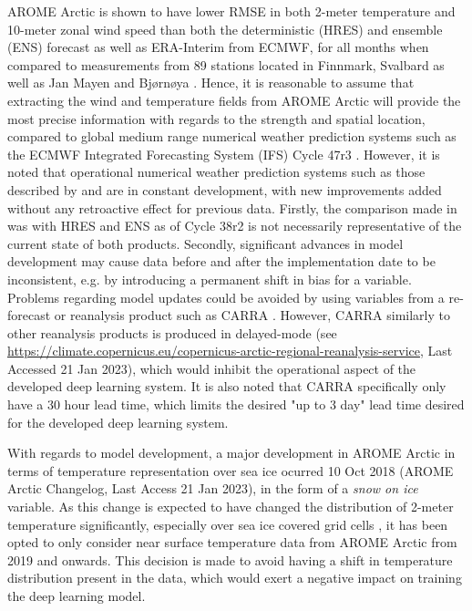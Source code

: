 \documentclass[../main/thesis.tex]{subfiles}
\begin{document}
AROME Arctic is shown to have lower RMSE in both 2-meter temperature and 10-meter zonal wind speed than both the deterministic (HRES) and ensemble (ENS) forecast as well as ERA-Interim from ECMWF, for all months when compared to measurements from 89 stations located in Finnmark, Svalbard as well as Jan Mayen and Bjørnøya \citep{Mueller2017}. Hence, it is reasonable to assume that extracting the wind and temperature fields from AROME Arctic will provide the most precise information with regards to the strength and spatial location, compared to global medium range numerical weather prediction systems such as the ECMWF Integrated Forecasting System (IFS) Cycle 47r3 \citep{Haiden2022}. However, it is noted that operational numerical weather prediction systems such as those described by \citet{Mueller2017} and \citet{Haiden2022} are in constant development, with new improvements added without any retroactive effect for previous data. Firstly, the comparison made in \citet{Mueller2017} was with HRES and ENS as of Cycle 38r2 \cite{Bauer2013} is not necessarily representative of the current state of both products. Secondly, significant advances in model development may cause data before and after the implementation date to be inconsistent, e.g. by introducing a permanent shift in bias for a variable. Problems regarding model updates could be avoided by using variables from a re-forecast or reanalysis product such as CARRA \citep{Koeltzow2022}. However, CARRA similarly to other reanalysis products is produced in delayed-mode (see \url{https://climate.copernicus.eu/copernicus-arctic-regional-reanalysis-service}, Last Accessed 21 Jan 2023), which would inhibit the operational aspect of the developed deep learning system. It is also noted that CARRA specifically only have a 30 hour lead time, which limits the desired "up to 3 day" lead time desired for the developed deep learning system.

With regards to model development, a major development in AROME Arctic in terms of temperature representation over sea ice ocurred 10 Oct 2018 (AROME Arctic Changelog, Last Access 21 Jan 2023), in the form of a \textit{snow on ice} variable. As this change is expected to have changed the distribution of 2-meter temperature significantly, especially over sea ice covered grid cells \citep{Batrak2019}, it has been opted to only consider near surface temperature data from AROME Arctic from 2019 and onwards. This decision is made to avoid having a shift in temperature distribution present in the data, which would exert a negative impact on training the deep learning model.
\end{document}
